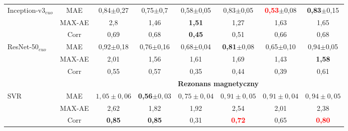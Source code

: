 \begin{enumerate}
\begin{table}[h!]
\begin{tabular}{lc||c|c|c|c|c|c}
 		Inception-v3$_{euo}$ & MAE & 0,84$\pm$0,27 & 0,75$\pm$0,7 & 0,58$\pm$0,05 & 0,83$\pm$0,05 & \textcolor{red}{\textbf{0,53}}$\pm$0,08 & \textbf{0,83}$\pm$0,15 \\
 		& MAX-AE & 2,8 & 1,46 & \textbf{1,51} & 1,27 & 1,63 & 1,65 \\
 		& Corr & 0,69 & 0,68 & \textbf{0,45} & 0,51 & 0,66 & 0,68 \\ \hline
 		ResNet-50$_{euo}$ & MAE & 0,92$\pm$0,18 & 0,76$\pm$0,16 & 0,68$\pm$0,04 & \textbf{0,81}$\pm$0,08 & 0,65$\pm$0,10 & 0,94$\pm$0,05 \\
 		& MAX-AE & 2,01 & 1,56 & 1,61 & 1,69& 1,43 & \textbf{1,58}\\
 		& Corr & 0,55 & 0,57 & 0,35 & 0,44 & 0,39 & 0,61 \\ \hline \hline
 		& & \multicolumn{6}{c}{\textbf{Rezonans magnetyczny}} \\
 		
 		SVR & MAE & $1,05\pm0,06$ & \textbf{0,56}$\pm0,03$ & $0,75\pm0,04$ & $0,91\pm0,05$ & $0,91\pm0,04$ & $0,94\pm0,05$\\
 		& MAX-AE & 2,62 & 1,82 & 1,92 & 2,54 & 2,01 & 2,38 \\
 		& Corr   & \textbf{0,85} & \textbf{0,85} & 0,31 & \textcolor{red}{\textbf{0,72}} & 0,65 & \textcolor{red}{\textbf{0,80}} \\
 		

\end{tabular}
\end{table}
\end{enumerate}
